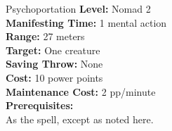 {Psychoportation}
{
	\textbf{Level:}
	Nomad 2\\
	\textbf{Manifesting Time:}
	1 mental action\\
	\textbf{Range:}
	27 meters\\
	\textbf{Target:}
	One creature\\
	\textbf{Saving Throw:}
	None\\
	\textbf{Cost:}
	10 power points\\
	\textbf{Maintenance Cost:}
	2 pp/minute\\
	\textbf{Prerequisites:}
	\\
}
{
	As the  spell, except as noted here.
}